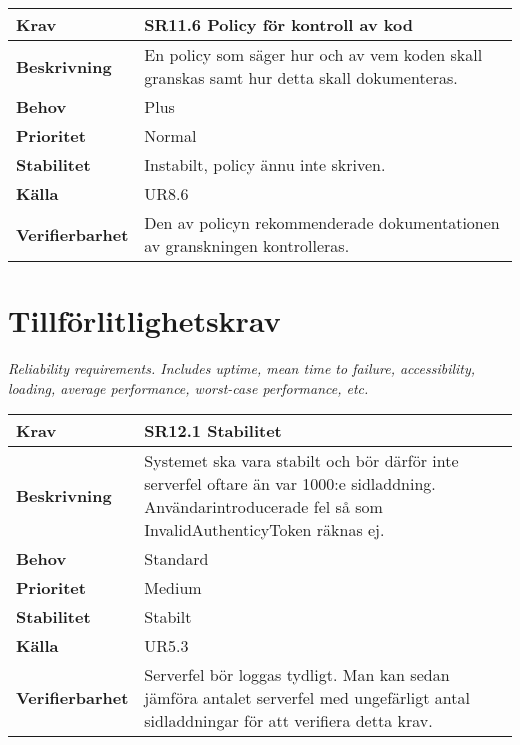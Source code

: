 \documentclass[a4paper, twoside, 11pt, titlepage]{article}
\begin{document}
\begin{tabular} { p{2.6cm} p{12.5cm} }
	\hline
	\sffamily\textbf{Krav} & \sffamily\textbf{SR11.6 Policy för kontroll av kod  } \\
	\hline
	\sffamily\textbf{Beskrivning} &  En policy som säger hur och av vem koden skall granskas samt hur detta skall dokumenteras.   \\
	\hline
	\sffamily\textbf{Behov} &  Plus  \\
	\hline
	\sffamily\textbf{Prioritet} &  Normal   \\
	\hline
	\sffamily\textbf{Stabilitet} &  Instabilt, policy ännu inte skriven.   \\
	\hline
	\sffamily\textbf{Källa} &  UR8.6   \\
	\hline
	\sffamily\textbf{Verifierbarhet} &  Den av policyn rekommenderade dokumentationen av granskningen kontrolleras.   \\
	\hline
\end{tabular}


\clearpage
\section{Tillförlitlighetskrav}


\emph{Reliability requirements. Includes uptime, mean time to failure, accessibility, loading, average performance, worst-case performance, etc.}

\begin{tabular} { p{2.6cm} p{12.5cm} }
	\hline
	\sffamily\textbf{Krav} & SR12.1 Stabilitet  \\
	\hline
	\sffamily\textbf{Beskrivning} & Systemet ska vara stabilt och bör därför inte serverfel oftare än var 1000:e sidladdning. Användarintroducerade fel så som InvalidAuthenticyToken räknas ej.  \\
	\hline
	\sffamily\textbf{Behov} & Standard  \\
	\hline
	\sffamily\textbf{Prioritet} & Medium  \\
	\hline
	\sffamily\textbf{Stabilitet} & Stabilt  \\
	\hline
	\sffamily\textbf{Källa} & UR5.3  \\
	\hline
	\sffamily\textbf{Verifierbarhet} & Serverfel bör loggas tydligt. Man kan sedan jämföra antalet serverfel med ungefärligt antal sidladdningar för att verifiera detta krav.  \\
	\hline
\end{tabular}
\vspace{6mm}
\end{document}
